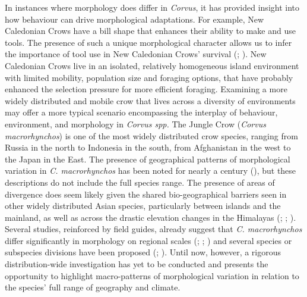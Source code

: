 \documentclass[10pt,a4paper]{article}
\begin{document}
In instances where morphology does differ in \emph{Corvus}, it has provided insight into how behaviour can drive morphological adaptations.
For example, New Caledonian Crows have a bill shape that enhances their ability to make and use tools.
The presence of such a unique morphological character allows us to infer the importance of tool use in New Caledonian Crows' survival (; ).
New Caledonian Crows live in an isolated, relatively homogeneous island environment with limited mobility, population size and foraging options, that have probably enhanced the selection pressure for more efficient foraging.
Examining a more widely distributed and mobile crow that lives across a diversity of environments may offer a more typical scenario encompassing the interplay of behaviour, environment, and morphology in \emph{Corvus spp.}
The Jungle Crow (\emph{Corvus macrorhynchos}) is one of the most widely distributed crow species, ranging from Russia in the north to Indonesia in the south, from Afghanistan in the west to the Japan in the East.
The presence of geographical patterns of morphological variation in \emph{C. macrorhynchos} has been noted for nearly a century (), but these descriptions do not include the full species range.
The presence of areas of divergence does seem likely given the shared bio-geographical barriers seen in other widely distributed Asian species, particularly between islands and the mainland, as well as across the drastic elevation changes in the Himalayas (; ; ).
Several studies, reinforced by field guides, already suggest that \emph{C. macrorhynchos} differ significantly in morphology on regional scales (; ; ) and several species or subspecies divisions have been proposed (; ).
Until now, however, a rigorous distribution-wide investigation has yet to be conducted and presents the opportunity to highlight macro-patterns of morphological variation in relation to the species' full range of geography and climate.
\end{document}
